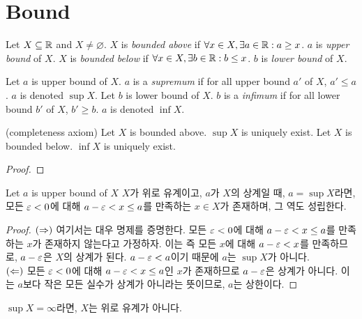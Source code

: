 \section{Bound}

\begin{definition}
  Let $X \subseteq \mathbb{R}$ and $ X \neq \varnothing$. $X$ is \emph{bounded above}
  if $\forall x \in X, \exists a \in \mathbb{R}:a \geq x$. $a$ is \emph{upper bound} of $X$.
  $X$ is \emph{bounded below} if $\forall x \in X, \exists b \in \mathbb{R}:b \leq x$.
  $b$ is \emph{lower bound} of $X$.
  \label{def:bound}
\end{definition}

\begin{definition}
  Let $a$ is upper bound of $X$. $a$ is a \emph{supremum} if for all upper bound
  $a'$ of $X$, $a' \leq a$. $a$ is denoted $\sup X$.
  Let $b$ is lower bound of $X$. $b$ is a \emph{infimum} if for all lower bound
  $b'$ of $X$, $b' \geq b$. $a$ is denoted $\inf X$.
  \label{def:sup}
\end{definition}

\begin{theorem}(completeness axiom)
  Let $X$ is bounded above. $\sup X$ is uniquely exist.
  Let $X$ is bounded below. $\inf X$ is uniquely exist.
  \label{pro:sup_uniq}
\end{theorem}
\begin{proof}

\end{proof}

\begin{theorem}
  Let $a$ is upper bound of $X$
  $X$가 위로 유계이고, $a$가 $X$의 상계일 때, $a = \sup X$라면, 모든 $\varepsilon < 0$에 대해
  $a - \varepsilon < x \leq a$를 만족하는 $x \in X$가 존재하며, 그 역도 성립한다.
  \label{pro:bound1}
\end{theorem}
\begin{proof}
  $(\Rightarrow)$ 여기서는 대우 명제를 증명한다. 모든 $\varepsilon < 0$에 대해 $a -
    \varepsilon < x \leq a$를 만족하는 $x$가 존재하지 않는다고 가정하자. 이는 즉
  모든 $x$에 대해 $a - \varepsilon < x$를 만족하므로, $a - \varepsilon$은 $X$의
  상계가 된다. $a - \varepsilon < a$이기 때문에 $a$는 $\sup X$가 아니다. \\
  $(\Leftarrow)$ 모든 $\varepsilon < 0$에 대해 $a - \varepsilon < x \leq a$인 $x$가
  존재하므로 $a - \varepsilon$은 상계가 아니다. 이는 $a$보다 작은 모든 실수가
  상계가 아니라는 뜻이므로, $a$는 상한이다.
\end{proof}

$\sup X = \infty$라면, $X$는 위로 유계가 아니다.

